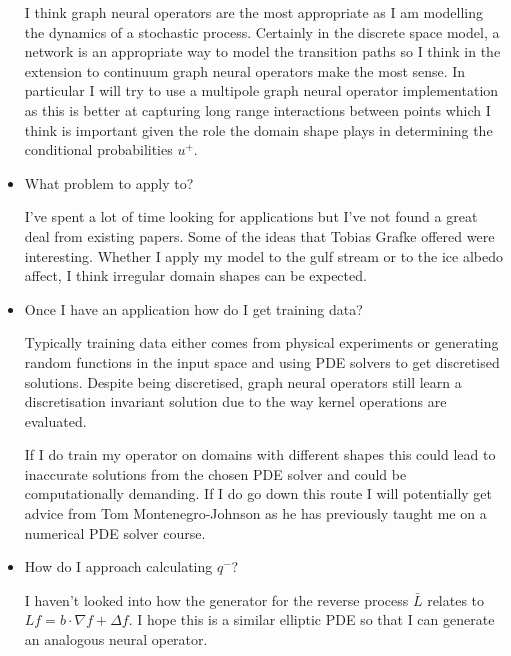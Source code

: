 \documentclass[ 11pt]{article}
\theoremstyle{definition}
\begin{document}
\begin{itemize}
I think graph neural operators are the most appropriate as I am modelling the dynamics of a stochastic process. Certainly in the discrete space model, a network is an appropriate way to model the transition paths so I think in the extension to continuum graph neural operators make the most sense. In particular I will try to use a multipole graph neural operator implementation as this is better at capturing long range interactions between points which I think is important given the role the domain shape plays in determining the conditional probabilities $u^+$.
\item What problem to apply to?

I've spent a lot of time looking for applications but I've not found a great deal from existing papers.
Some of the ideas that Tobias Grafke offered were interesting. Whether I apply my model to the gulf stream or to the ice albedo affect, I think irregular domain shapes can be expected.  

\item Once I have an application how do I get training data?

Typically training data either comes from physical experiments or generating random functions in the input space and using PDE solvers to get discretised solutions. Despite being discretised, graph neural operators still learn a discretisation invariant solution due to the way kernel operations are evaluated. 

If I do train my operator on domains with different shapes this could lead to inaccurate solutions from the chosen PDE solver and could be computationally demanding. If I do go down this route I will potentially get advice from Tom Montenegro-Johnson as he has previously taught me on a numerical PDE solver course. 

\item How do I approach calculating $q^-$?

I haven't looked into how the generator for the reverse process $\bar{L}$ relates to $Lf = b\cdot \nabla f+\Delta f $. I hope this is a similar elliptic PDE so that I can generate an analogous neural operator. 
 
\end{itemize}
\end{document}
